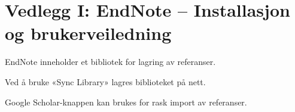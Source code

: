 \chapter{Vedlegg I: EndNote – Installasjon og brukerveiledning}

EndNote inneholder et bibliotek for lagring av referanser.

Ved å bruke «Sync Library» lagres biblioteket på nett.

Google Scholar-knappen kan brukes for rask import av referanser.

